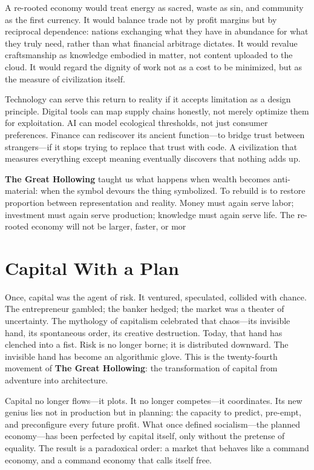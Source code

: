 \documentclass[11pt,twoside]{book}
\begin{document}
A re-rooted economy would treat energy as sacred, waste as sin, and community as the first currency.  
It would balance trade not by profit margins but by reciprocal dependence: nations exchanging what they have in abundance for what they truly need, rather than what financial arbitrage dictates.  
It would revalue craftsmanship as knowledge embodied in matter, not content uploaded to the cloud.  
It would regard the dignity of work not as a cost to be minimized, but as the measure of civilization itself.

Technology can serve this return to reality if it accepts limitation as a design principle.  
Digital tools can map supply chains honestly, not merely optimize them for exploitation.  
AI can model ecological thresholds, not just consumer preferences.  
Finance can rediscover its ancient function—to bridge trust between strangers—if it stops trying to replace that trust with code.  
A civilization that measures everything except meaning eventually discovers that nothing adds up.

\textbf{The Great Hollowing} taught us what happens when wealth becomes anti-material: when the symbol devours the thing symbolized.  
To rebuild is to restore proportion between representation and reality.  
Money must again serve labor; investment must again serve production; knowledge must again serve life.  
The re-rooted economy will not be larger, faster, or mor

% 
\chapter{Capital With a Plan}
\label{ch:35}

Once, capital was the agent of risk.  
It ventured, speculated, collided with chance.  The entrepreneur gambled; the banker hedged; the market was a theater of uncertainty.  The mythology of capitalism celebrated that chaos—its invisible hand, its spontaneous order, its creative destruction.  Today, that hand has clenched into a fist.  Risk is no longer borne; it is distributed downward.  The invisible hand has become an algorithmic glove.  This is the twenty-fourth movement of \textbf{The Great Hollowing}: the transformation of capital from adventure into architecture.

Capital no longer flows—it plots.  It no longer competes—it coordinates.  Its new genius lies not in production but in planning: the capacity to predict, pre-empt, and preconfigure every future profit.  What once defined socialism—the planned economy—has been perfected by capital itself, only without the pretense of equality.  The result is a paradoxical order: a market that behaves like a command economy, and a command economy that calls itself free.
\end{document}
